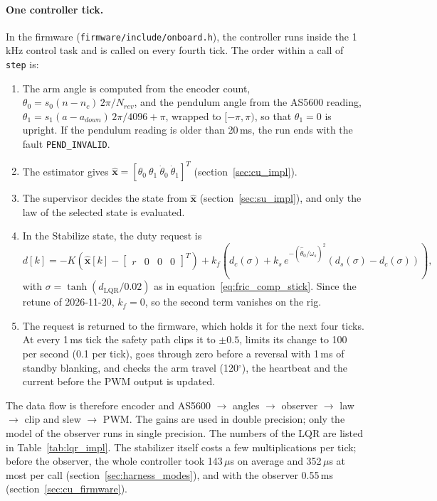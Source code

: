 \documentclass[a4paper,11pt]{article}
\begin{document}
\paragraph{One controller tick.} In the firmware (\nolinkurl{firmware/include/onboard.h}), the controller runs inside the 1\,kHz control task and is called on every fourth tick. The order within a call of \texttt{step} is:
\begin{enumerate}
  \item The arm angle is computed from the encoder count, $\theta_0 = s_0 (n - n_c)\,2\pi/N_{rev}$, and the pendulum angle from the AS5600 reading, $\theta_1 = s_1 (a - a_{down})\,2\pi/4096 + \pi$, wrapped to $[-\pi, \pi)$, so that $\theta_1 = 0$ is upright. If the pendulum reading is older than 20\,ms, the run ends with the fault \texttt{PEND\_INVALID}.
  \item The estimator gives $\hat{\mathbf{x}} = [\theta_0\ \theta_1\ \dot\theta_0\ \dot\theta_1]^T$ (section~\ref{sec:cu_impl}).
  \item The supervisor decides the state from $\hat{\mathbf{x}}$ (section~\ref{sec:su_impl}), and only the law of the selected state is evaluated.
  \item In the Stabilize state, the duty request is
  \begin{equation}
    d[k] = -K\left(\hat{\mathbf{x}}[k] - \begin{bmatrix} r & 0 & 0 & 0 \end{bmatrix}^T\right) + k_f\left( d_c(\sigma) + k_s\, e^{-(\hat{\dot\theta}_0/\omega_s)^2}\left( d_s(\sigma) - d_c(\sigma) \right) \right),
    \label{eq:lqr_impl}
  \end{equation}
  with $\sigma = \tanh(d_{\mathrm{LQR}}/0.02)$ as in equation~\ref{eq:fric_comp_stick}. Since the retune of 2026-11-20, $k_f = 0$, so the second term vanishes on the rig.
  \item The request is returned to the firmware, which holds it for the next four ticks. At every 1\,ms tick the safety path clips it to $\pm0.5$, limits its change to 100 per second (0.1 per tick), goes through zero before a reversal with 1\,ms of standby blanking, and checks the arm travel (120$^\circ$), the heartbeat and the current before the PWM output is updated.
\end{enumerate}
The data flow is therefore encoder and AS5600 $\rightarrow$ angles $\rightarrow$ observer $\rightarrow$ law $\rightarrow$ clip and slew $\rightarrow$ PWM. The gains are used in double precision; only the model of the observer runs in single precision. The numbers of the LQR are listed in Table~\ref{tab:lqr_impl}. The stabilizer itself costs a few multiplications per tick; before the observer, the whole controller took 143\,$\mu$s on average and 352\,$\mu$s at most per call (section~\ref{sec:harness_modes}), and with the observer 0.55\,ms (section~\ref{sec:cu_firmware}).
\end{document}
